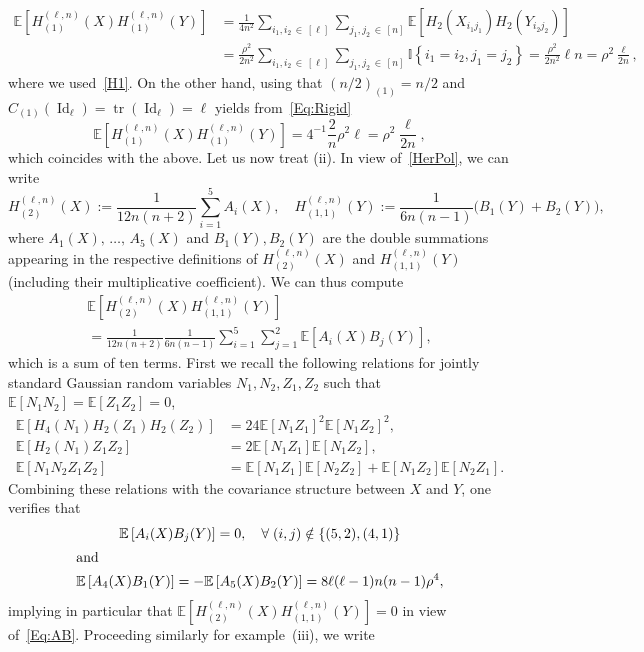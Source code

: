 \documentclass[AHL,Unicode,longabstracts,published]{cedram}
\DeclareMathOperator{\Id}{Id}
\DeclareMathOperator{\Tr}{tr}
\newcommand{\E}[1]{\mathbb{E}\left[#1\right]}
\newcommand{\ind}[1]{\mathbb{I}
\left\{#1\right\}}
\let\oldforall\forall
\renewcommand*{\forall}{\mathrel{\oldforall}}
\begin{document}
\begin{exam}
\begin{align*}
\E{H_{(1)}^{(\ell,n)}(X)H_{(1)}^{(\ell,n)}(Y)} &= \frac{1}{4n^2} \sum_{i_1,i_2\,\in\,[\ell]}\sum_{j_1,j_2\,\in\,[n]} \E{H_2\left(X_{i_1j_1}\right)H_2\left(Y_{i_2j_2}\right)}\\
&= \frac{\rho^2}{2n^2} \sum_{i_1,i_2\,\in\,[\ell]}\sum_{j_1,j_2\,\in\,[n]} \ind{i_1=i_2,j_1=j_2} = \frac{\rho^2}{2n^2}\ell n = \rho^2 \frac{\ell}{2n},
\end{align*}
where we used~\eqref{H1}. On the other hand, using that $(n/2)_{(1)}=n/2$ and $C_{(1)}(\Id_{\ell})=\Tr(\Id_{\ell})=\ell$ yields from~\eqref{Eq:Rigid}
\[
\E{H_{(1)}^{(\ell,n)}(X)H_{(1)}^{(\ell,n)}(Y)} = 4^{-1} \frac{2}{n} \rho^2 \ell =
\rho^2 \frac{\ell}{2n},
\]
which coincides with the above. Let us now treat (ii). In view of~\eqref{HerPol}, we can write
\[
H_{(2)}^{(\ell,n)}(X) := \frac{1}{12n(n+2)}\sum_{i=1}^5A_i(X), \quad H_{(1,1)}^{(\ell,n)}(Y) :=
\frac{1}{6n(n-1)} \big(B_1(Y)+B_2(Y)\big),
\]
where $A_1(X),\,\ldots,\,A_5(X)$ and $B_1(Y),B_2(Y)$ are the double summations appearing in the respective definitions of $H_{(2)}^{(\ell,n)}(X)$ and $H_{(1,1)}^{(\ell,n)}(Y)$ (including their multiplicative coefficient). We can thus compute
\begin{multline}\label{Eq:AB}
\E{H_{(2)}^{(\ell,n)}(X) H_{(1,1)}^{(\ell,n)}(Y)}\\
= \frac{1}{12n(n+2)} \frac{1}{6n(n-1)}
\sum_{i=1}^5\sum_{j=1}^2 \E{A_i(X)B_j(Y)},
\end{multline}
which is a sum of ten terms. First we recall the following relations for jointly standard Gaussian random variables $N_1,N_2,Z_1,Z_2$ such that $\E{N_1N_2}=\E{Z_1Z_2}=0$,
\begin{align*}
\E{H_4(N_1)H_2(Z_1)H_2(Z_2)} &= 24\E{N_1Z_1}^2\E{N_1Z_2}^2,\\
\E{H_2(N_1)Z_1Z_2} &= 2\E{N_1Z_1}\E{N_1Z_2},\\
\E{N_1N_2Z_1Z_2} &=
\E{N_1Z_1}\E{N_2Z_2}+
\E{N_1Z_2}\E{N_2Z_1}.
\end{align*}
Combining these relations with the covariance structure between $X$ and $Y$, one verifies that
\begin{gather*}
\E{A_i(X)B_j(Y)} = 0, \quad \forall (i,j)\notin \{(5,2),(4,1)\}
\\
\intertext{and}
\E{A_4(X)B_1(Y)} = -\E{A_5(X)B_2(Y)} = 8\ell(\ell-1)n(n-1)\rho^4,
\end{gather*}
implying in particular that $\mathbb{E}[H_{(2)}^{(\ell,n)}(X) H_{(1,1)}^{(\ell,n)}(Y)] =0$ in view of~\eqref{Eq:AB}. Proceeding similarly for example~(iii), we write

\end{exam}
\end{document}
